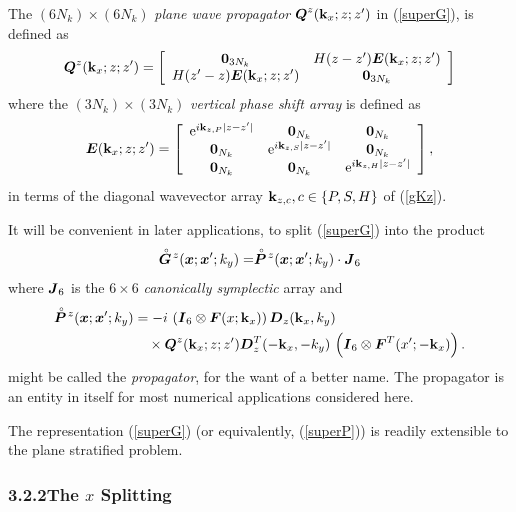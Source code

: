 \documentclass[11pt,a4paper]{article}
\newcommand{\bmi}[1]{\mbox{\boldmath$\mit #1$\unboldmath}}
\newcommand{\rf}[1]{\stackrel{\scriptscriptstyle _{\,\,\circ}}{ #1}}
\begin{document}
The $(6N_k)\times (6N_k)$ {\em plane wave propagator\/}
${\bmi Q}^{z}({\bf k}_{x};z;z^{\prime})$ in (\ref{superG}),
is defined  as
\begin{equation} \label{Qdef}
{\bmi Q}^{z}({\bf k}_x;z;z^{\prime})=
\left[{\begin{array}{cc}{\bf 0}_{3N_k}&H(z-{z}^{\prime}){\bmi E}({\bf k}_x;z;{z}^{\prime})\\
H(z^{\prime}-{z}){\bmi E}({\bf k}_x;z;{z}^{\prime})&{\bf 0}_{3N_k}\end{array}}\right]
\end{equation}
where the $(3N_k)\times (3N_k)$ {\em vertical phase shift array\/} is
defined as
\[
{\bmi E}({\bf k}_x;z;{z}^{\prime})=\left[{\begin{array}{ccc}
{\rm e}^{i{\bf k}_{z,P}|z-{z}^{\prime}|}&{\bf 0}_{N_k}&{\bf 0}_{N_k}\\
{\bf 0}_{N_k}&{\rm e}^{
i{\bf k}_{z,S}|z-{z}^{\prime}|}&{\bf 0}_{N_k}\\ {\bf 0}_{N_k}&{\bf 0}_{N_k}&{\rm e}^{
i{\bf k}_{z,H}|z-{z}^{\prime}|}\end{array}}\right] ,
\]
in terms of the diagonal wavevector array ${\bf k}_{z,c}, c\in\{P,S,H
\}$ of (\ref{gKz}).

It will be convenient in later applications,  to split (\ref{superG}) into the product
\[
\rf{\bmi G}\!{}^{z}({\bmi x};{\bmi x}^{\prime};k_y)=
\rf{\bmi P}\!{}^{z}({\bmi x};{\bmi x}^{\prime};k_y)\cdot{\bmi J}_6
\]
where ${\bmi J}_6$ is the $6\times 6$ {\em canonically symplectic\/} array and
\begin{align} \label{superP}
\rf{\bmi P}\!{}^{z}({\bmi x};{\bmi x}^{\prime};k_y)
&=- i\,\left({\bmi I}_6\otimes
{\bmi F}(x;{\bf k}_{x})  \right) {\bmi  D}_{z}({\bf k}_{x},{k}_{y})\nonumber\\
&\quad\times
{\bmi Q}^{z}({\bf k}_{x};z;z^{\prime}){\bmi  D}_{z}^{T}(-{\bf k}_{x},-{k}_{y})
\,\left({\bmi I}_6\otimes {\bmi F}^{T}(x^{\prime};-{\bf k}_{x})  \right).
\end{align}
might be called the {\em propagator\/}, for the want of a better name. The
propagator is an entity in itself for most numerical applications
considered here.

The representation (\ref{superG}) (or equivalently, (\ref{superP})) is readily extensible
to the plane stratified problem.

\subsubsection*{3.2.2\quad The $x$ Splitting}
\end{document}
